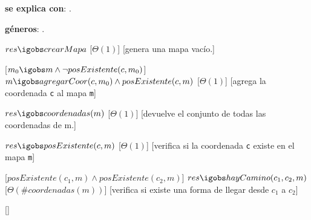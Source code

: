 \begin{Interfaz}


  \textbf{se explica con}: .

  \textbf{g\'eneros}: .



  {$res \igobs crearMapa$}%
  [$\Theta(1)$]
  [genera una mapa vac\'io.]


  [$m_0 \igobs m \land \lnot posExistente(c, m_0) $]  
  {$m \igobs agregarCoor(c, m_0)  \land posExistente(c, m)$}
  [$\Theta(1)$]
  [agrega la coordenada \texttt{c} al mapa \texttt{m}]


  {$res \igobs coordenadas(m)$}%
  [$\Theta(1)$]
  [devuelve el conjunto de todas las coordenadas de m.]


  {$res \igobs posExistente(c, m)$}
  [$\Theta(1)$]
  [verifica si la coordenada \texttt{c} existe en el mapa \texttt{m}]


  [$posExistente(c_1, m) \land posExistente(c_2, m) $]
  {$res \igobs hayCamino(c_1, c_2, m)$}
  [$\Theta(\# coordenadas(m))$]
  [verifica si existe una forma de llegar desde \texttt{$c_1$} a \texttt{$c_2$}]


\end{Interfaz}

\begin{Representacion}
 
  \begin{Estructura}{}[]
  \end{Estructura}


  

  \AbsFc[]{}

\end{Representacion}

\begin{Algoritmos}
  
\end{Algoritmos}